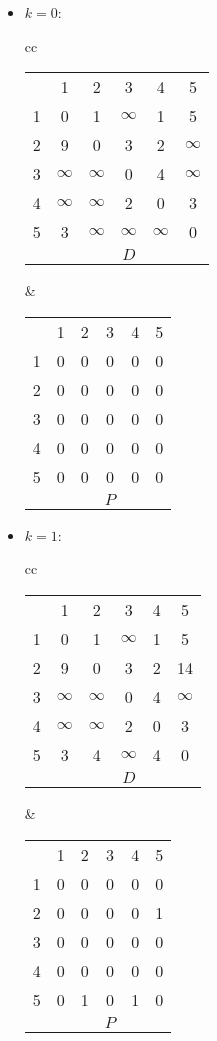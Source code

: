 \documentclass[natbib,12pt]{article}
\begin{document}
	\begin{itemize}
		\item $k=0$:
			\begin{tabular}{cc}
			\begin{tabular}{cccccc}
				& 1 & 2 & 3 & 4 & 5 \\ \cline{2-6} 
				\multicolumn{1}{l|}{1} & 0 & 1 & $\infty$ & 1 & 5 \\
				\multicolumn{1}{l|}{2} & 9 & 0 & 3 & 2 & $\infty$ \\
				\multicolumn{1}{l|}{3} & $\infty$ & $\infty$ & 0 & 4 & $\infty$ \\
				\multicolumn{1}{l|}{4} & $\infty$ & $\infty$ & 2 & 0 & 3 \\
				\multicolumn{1}{l|}{5} & 3 & $\infty$ & $\infty$ & $\infty$ & 0 \\
				&&&$D$&&
			\end{tabular}
			&
			\begin{tabular}{cccccc}
				& 1 & 2 & 3 & 4 & 5 \\ \cline{2-6} 
				\multicolumn{1}{l|}{1} & 0 & 0 & 0 & 0 & 0 \\
				\multicolumn{1}{l|}{2} & 0 & 0 & 0 & 0 & 0 \\
				\multicolumn{1}{l|}{3} & 0 & 0 & 0 & 0 & 0 \\
				\multicolumn{1}{l|}{4} & 0 & 0 & 0 & 0 & 0 \\
				\multicolumn{1}{l|}{5} & 0 & 0 & 0 & 0 & 0 \\
				&&&$P$&&
			\end{tabular}
		\end{tabular}
	
		\item $k=1$:
\begin{tabular}{cc}
	\begin{tabular}{cccccc}
		& 1 & 2 & 3 & 4 & 5 \\ \cline{2-6} 
		\multicolumn{1}{l|}{1} & 0 & 1 & $\infty$ & 1 & 5 \\
		\multicolumn{1}{l|}{2} & 9 & 0 & 3 & 2 & 14 \\
		\multicolumn{1}{l|}{3} & $\infty$ & $\infty$ & 0 & 4 & $\infty$ \\
		\multicolumn{1}{l|}{4} & $\infty$ & $\infty$ & 2 & 0 & 3 \\
		\multicolumn{1}{l|}{5} & 3 & 4 & $\infty$ & 4 & 0 \\
		&&&$D$&&
	\end{tabular}
	&
	\begin{tabular}{cccccc}
		& 1 & 2 & 3 & 4 & 5 \\ \cline{2-6} 
		\multicolumn{1}{l|}{1} & 0 & 0 & 0 & 0 & 0 \\
		\multicolumn{1}{l|}{2} & 0 & 0 & 0 & 0 & 1 \\
		\multicolumn{1}{l|}{3} & 0 & 0 & 0 & 0 & 0 \\
		\multicolumn{1}{l|}{4} & 0 & 0 & 0 & 0 & 0 \\
		\multicolumn{1}{l|}{5} & 0 & 1 & 0 & 1 & 0 \\
		&&&$P$&&
	\end{tabular}
\end{tabular}
		

\end{itemize}
\end{document}
